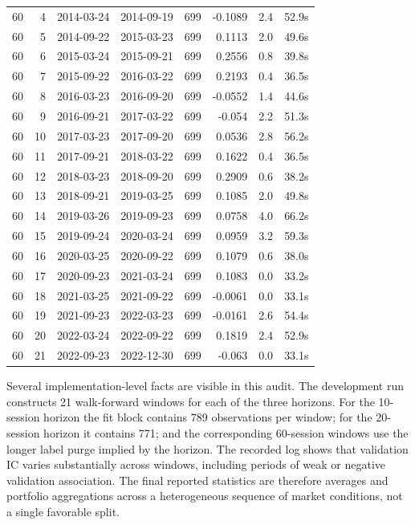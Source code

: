\documentclass[10pt]{article}
\begin{document}
\begin{longtable}{lrrrrrrr}
60 & 4 & 2014-03-24 & 2014-09-19 & 699 & -0.1089 & 2.4 & 52.9s \\
60 & 5 & 2014-09-22 & 2015-03-23 & 699 & 0.1113 & 2.0 & 49.6s \\
60 & 6 & 2015-03-24 & 2015-09-21 & 699 & 0.2556 & 0.8 & 39.8s \\
60 & 7 & 2015-09-22 & 2016-03-22 & 699 & 0.2193 & 0.4 & 36.5s \\
60 & 8 & 2016-03-23 & 2016-09-20 & 699 & -0.0552 & 1.4 & 44.6s \\
60 & 9 & 2016-09-21 & 2017-03-22 & 699 & -0.054 & 2.2 & 51.3s \\
60 & 10 & 2017-03-23 & 2017-09-20 & 699 & 0.0536 & 2.8 & 56.2s \\
60 & 11 & 2017-09-21 & 2018-03-22 & 699 & 0.1622 & 0.4 & 36.5s \\
60 & 12 & 2018-03-23 & 2018-09-20 & 699 & 0.2909 & 0.6 & 38.2s \\
60 & 13 & 2018-09-21 & 2019-03-25 & 699 & 0.1085 & 2.0 & 49.8s \\
60 & 14 & 2019-03-26 & 2019-09-23 & 699 & 0.0758 & 4.0 & 66.2s \\
60 & 15 & 2019-09-24 & 2020-03-24 & 699 & 0.0959 & 3.2 & 59.3s \\
60 & 16 & 2020-03-25 & 2020-09-22 & 699 & 0.1079 & 0.6 & 38.0s \\
60 & 17 & 2020-09-23 & 2021-03-24 & 699 & 0.1083 & 0.0 & 33.2s \\
60 & 18 & 2021-03-25 & 2021-09-22 & 699 & -0.0061 & 0.0 & 33.1s \\
60 & 19 & 2021-09-23 & 2022-03-23 & 699 & -0.0161 & 2.6 & 54.4s \\
60 & 20 & 2022-03-24 & 2022-09-22 & 699 & 0.1819 & 2.4 & 52.9s \\
60 & 21 & 2022-09-23 & 2022-12-30 & 699 & -0.063 & 0.0 & 33.1s \\
\bottomrule
\end{longtable}
\endgroup

Several implementation-level facts are visible in this audit. The development run constructs 21 walk-forward windows for each of the three horizons. For the 10-session horizon the fit block contains 789 observations per window; for the 20-session horizon it contains 771; and the corresponding 60-session windows use the longer label purge implied by the horizon. The recorded log shows that validation IC varies substantially across windows, including periods of weak or negative validation association. The final reported statistics are therefore averages and portfolio aggregations across a heterogeneous sequence of market conditions, not a single favorable split.
\end{document}
